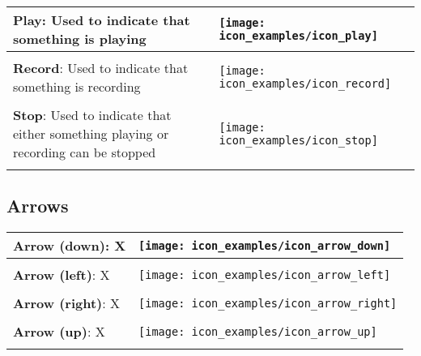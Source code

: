 \begin{longtable}{m{\textwidth-2.2cm} m{1.5cm}}
	\textbf{Play}: Used to indicate that something is playing & \parbox[c]{1.2cm}{
	\texttt{[image: icon\_examples/icon\_play]}} \\[0.6cm] \hline \\[-0.6em]

	\textbf{Record}: Used to indicate that something is recording & \parbox[c]{1.2cm}{
	\texttt{[image: icon\_examples/icon\_record]}} \\[0.6cm] \hline \\[-0.6em]

	\textbf{Stop}: Used to indicate that either something playing or recording can be stopped & \parbox[c]{1.2cm}{
	\texttt{[image: icon\_examples/icon\_stop]}} \\[0.6cm] \hline \\[-0.6em]
\end{longtable}


\subsection{Arrows}


\begin{longtable}{m{\textwidth-2.2cm} m{1.5cm}}
	\textbf{Arrow (down)}: X & \parbox[c]{1.2cm}{
	\texttt{[image: icon\_examples/icon\_arrow\_down]}} \\[0.6cm] \hline \\[-0.6em]

	\textbf{Arrow (left)}: X & \parbox[c]{1.2cm}{
	\texttt{[image: icon\_examples/icon\_arrow\_left]}} \\[0.6cm] \hline \\[-0.6em]

	\textbf{Arrow (right)}: X & \parbox[c]{1.2cm}{
	\texttt{[image: icon\_examples/icon\_arrow\_right]}} \\[0.6cm] \hline \\[-0.6em]

	\textbf{Arrow (up)}: X & \parbox[c]{1.2cm}{
	\texttt{[image: icon\_examples/icon\_arrow\_up]}} \\[0.6cm] \hline \\[-0.6em]
\end{longtable}


